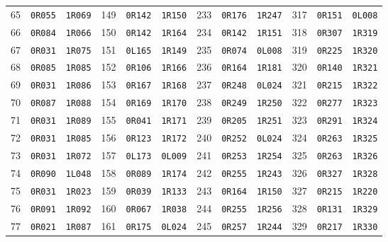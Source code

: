 \begin{longtable}{rll@{\qquad}rll@{\qquad}rll@{\qquad}rll}
65 & \texttt{0R055} & \texttt{1R069} & 149 & \texttt{0R142} & \texttt{1R150} & 233 & \texttt{0R176} & \texttt{1R247} & 317 & \texttt{0R151} & \texttt{0L008} \\
66 & \texttt{0R084} & \texttt{1R066} & 150 & \texttt{0R142} & \texttt{1R164} & 234 & \texttt{0R142} & \texttt{1R151} & 318 & \texttt{0R307} & \texttt{1R319} \\
67 & \texttt{0R031} & \texttt{1R075} & 151 & \texttt{0L165} & \texttt{1R149} & 235 & \texttt{0R074} & \texttt{0L008} & 319 & \texttt{0R225} & \texttt{1R320} \\
68 & \texttt{0R085} & \texttt{1R085} & 152 & \texttt{0R106} & \texttt{1R166} & 236 & \texttt{0R164} & \texttt{1R181} & 320 & \texttt{0R140} & \texttt{1R321} \\
69 & \texttt{0R031} & \texttt{1R086} & 153 & \texttt{0R167} & \texttt{1R168} & 237 & \texttt{0R248} & \texttt{0L024} & 321 & \texttt{0R215} & \texttt{1R322} \\
70 & \texttt{0R087} & \texttt{1R088} & 154 & \texttt{0R169} & \texttt{1R170} & 238 & \texttt{0R249} & \texttt{1R250} & 322 & \texttt{0R277} & \texttt{1R323} \\
71 & \texttt{0R031} & \texttt{1R089} & 155 & \texttt{0R041} & \texttt{1R171} & 239 & \texttt{0R205} & \texttt{1R251} & 323 & \texttt{0R291} & \texttt{1R324} \\
72 & \texttt{0R031} & \texttt{1R085} & 156 & \texttt{0R123} & \texttt{1R172} & 240 & \texttt{0R252} & \texttt{0L024} & 324 & \texttt{0R263} & \texttt{1R325} \\
73 & \texttt{0R031} & \texttt{1R072} & 157 & \texttt{0L173} & \texttt{0L009} & 241 & \texttt{0R253} & \texttt{1R254} & 325 & \texttt{0R263} & \texttt{1R326} \\
74 & \texttt{0R090} & \texttt{1L048} & 158 & \texttt{0R089} & \texttt{1R174} & 242 & \texttt{0R255} & \texttt{1R243} & 326 & \texttt{0R327} & \texttt{1R328} \\
75 & \texttt{0R031} & \texttt{1R023} & 159 & \texttt{0R039} & \texttt{1R133} & 243 & \texttt{0R164} & \texttt{1R150} & 327 & \texttt{0R215} & \texttt{1R220} \\
76 & \texttt{0R091} & \texttt{1R092} & 160 & \texttt{0R067} & \texttt{1R038} & 244 & \texttt{0R255} & \texttt{1R256} & 328 & \texttt{0R131} & \texttt{1R329} \\
77 & \texttt{0R021} & \texttt{1R087} & 161 & \texttt{0R175} & \texttt{0L024} & 245 & \texttt{0R257} & \texttt{1R244} & 329 & \texttt{0R217} & \texttt{1R330} \\

\end{longtable}

